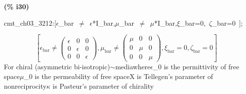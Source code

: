 \documentclass[fleqn]{article}
\begin{document}
\noindent
\begin{minipage}[t]{4.000000em}\color{red}\bfseries
(\% i30)	
\end{minipage}
\begin{minipage}[t]{\textwidth}\color{blue}
cmt\_ch03\_3212:[\ensuremath{\epsilon}\_bar\ \ensuremath{\neq}\ \ensuremath{\epsilon}*I\_bar,\ensuremath{\mu}\_bar\ \ensuremath{\neq}\ \ensuremath{\mu}*I\_bar,\ensuremath{\xi}\_bar=0,\ \ensuremath{\zeta}\_bar=0\ ];
\end{minipage}
\[\displaystyle \tag{cmt\_ ch03\_ 3212} 
\left[ {{\epsilon }_{\ensuremath{\mathrm{bar}}}}\operatorname{\neq }\begin{pmatrix}\epsilon  & 0 & 0\\
0 & \epsilon  & 0\\
0 & 0 & \epsilon \end{pmatrix}\operatorname{,}{{\mu }_{\ensuremath{\mathrm{bar}}}}\operatorname{\neq }\begin{pmatrix}\mu  & 0 & 0\\
0 & \mu  & 0\\
0 & 0 & \mu \end{pmatrix}\operatorname{,}{{\xi }_{\ensuremath{\mathrm{bar}}}}=0\operatorname{,}{{\zeta }_{\ensuremath{\mathrm{bar}}}}=0\right] \mbox{}
\]
For chiral (asymmetric bi-isotropic)\ensuremath{\sim }mediawhere\ensuremath{\epsilon}\_0 is the permittivity of free space\ensuremath{\mu}\_0 is the permeability of free spaceX is Tellegen's parameter of nonreciprocity\ensuremath{\kappa} is Pasteur's parameter of chirality
\end{document}
